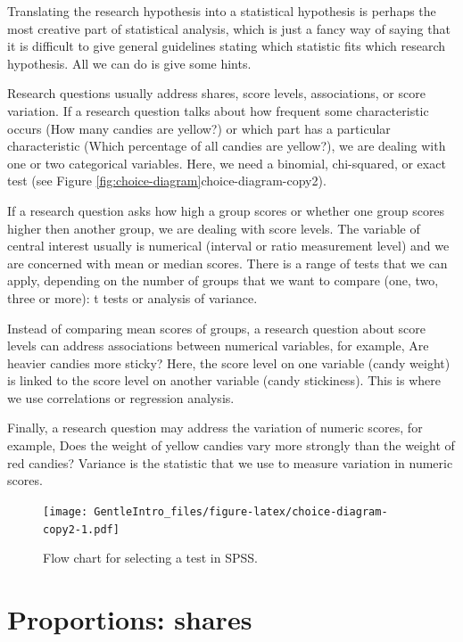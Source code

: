 \documentclass[a4paper]{book}
\theoremstyle{definition}
\theoremstyle{definition}
\theoremstyle{definition}
\theoremstyle{remark}
\begin{document}
Translating the research hypothesis into a statistical hypothesis is
perhaps the most creative part of statistical analysis, which is just a
fancy way of saying that it is difficult to give general guidelines
stating which statistic fits which research hypothesis. All we can do is
give some hints.

Research questions usually address shares, score levels, associations,
or score variation. If a research question talks about how frequent some
characteristic occurs (How many candies are yellow?) or which part has a
particular characteristic (Which percentage of all candies are yellow?),
we are dealing with one or two categorical variables. Here, we need a
binomial, chi-squared, or exact test (see Figure
\ref{fig:choice-diagram}choice-diagram-copy2).

If a research question asks how high a group scores or whether one group
scores higher then another group, we are dealing with score levels. The
variable of central interest usually is numerical (interval or ratio
measurement level) and we are concerned with mean or median scores.
There is a range of tests that we can apply, depending on the number of
groups that we want to compare (one, two, three or more): t tests or
analysis of variance.

Instead of comparing mean scores of groups, a research question about
score levels can address associations between numerical variables, for
example, Are heavier candies more sticky? Here, the score level on one
variable (candy weight) is linked to the score level on another variable
(candy stickiness). This is where we use correlations or regression
analysis.

Finally, a research question may address the variation of numeric
scores, for example, Does the weight of yellow candies vary more
strongly than the weight of red candies? Variance is the statistic that
we use to measure variation in numeric scores.

\begin{figure}[H]
\centering
\texttt{[image: GentleIntro\_files/figure-latex/choice-diagram-copy2-1.pdf]}
\caption{\label{fig:choice-diagram-copy2}Flow chart for selecting a test in
SPSS.}
\end{figure}

\section*{Proportions: shares}\label{proportions-shares}
\end{document}
